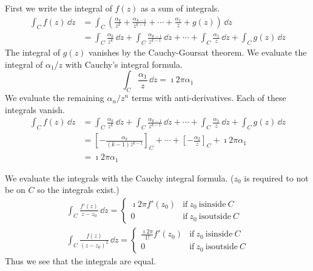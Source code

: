 {\begin{Solution}
  First we write the integral of $f(z)$ as a sum of integrals.
  \begin{align*}
    \int_C f(z)\,\dd z
    &= \int_C \left( \frac{\alpha_k}{z^k} + \frac{\alpha_{k-1}}{z^{k-1}} + \cdots +\frac{\alpha_1}{z} + g(z) \right)
    \,\dd z
    \\
    &= \int_C \frac{\alpha_k}{z^k}\,\dd z + \int_C \frac{\alpha_{k-1}}{z^{k-1}}\,\dd z + \cdots 
    + \int_C \frac{\alpha_1}{z}\,\dd z + \int_C g(z)\,\dd z
  \end{align*}
  The integral of $g(z)$ vanishes by the Cauchy-Goursat theorem.  We evaluate 
  the integral of $\alpha_1 / z$ with Cauchy's integral formula.
  \[
  \int_C \frac{\alpha_1}{z}\,\dd z = \imath 2 \pi \alpha_1
  \]
  We evaluate the remaining $\alpha_n / z^n$ terms with anti-derivatives.  Each of 
  these integrals vanish.
  \begin{align*}
    \int_C f(z)\,\dd z
    &= \int_C \frac{\alpha_k}{z^k}\,\dd z + \int_C \frac{\alpha_{k-1}}{z^{k-1}}\,\dd z + \cdots 
    + \int_C \frac{\alpha_1}{z}\,\dd z + \int_C g(z)\,\dd z
    \\
    &= \left[ - \frac{\alpha_k}{(k - 1) z^{k - 1}} \right]_C 
    + \cdots + \left[ - \frac{\alpha_2}{z} \right]_C
    + \imath 2 \pi \alpha_1
    \\
    &= \imath 2 \pi \alpha_1
  \end{align*}  
\end{Solution}







\begin{Solution}
  We evaluate the integrals with the Cauchy integral formula.
  ($z_0$ is required to not be on $C$ so the integrals exist.)
  \begin{gather*}
    \int_C \frac{f'(z)}{z - z_0}\,\dd z 
    = \begin{cases}
      \imath 2 \pi f'(z_0) &\mathrm{if}\ z_0\ \mathrm{is inside}\ C
      \\
      0 &\mathrm{if}\ z_0\ \mathrm{is outside}\ C
    \end{cases}
    \\
    \int_C \frac{f(z)}{(z - z_0)^2}\,\dd z 
    = \begin{cases}
      \frac{\imath 2 \pi}{1!} f'(z_0) &\mathrm{if}\ z_0\ \mathrm{is inside}\ C
      \\
      0 &\mathrm{if}\ z_0\ \mathrm{is outside}\ C
    \end{cases}
  \end{gather*}
  Thus we see that the integrals are equal.
\end{Solution}









}
